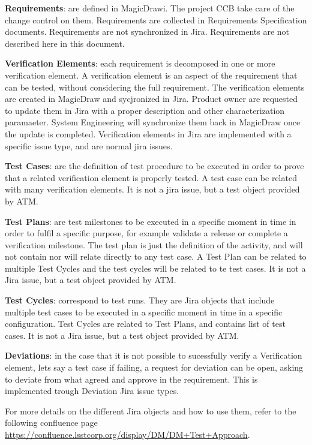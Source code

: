 {\bf Requirements}: are defined in MagicDrawi. The project CCB take care of the change control on them.
Requirements are collected in Requirements Specification documents.
Requirements are not synchronized in Jira.
Requirements are not described here in this document.

{\bf Verification Elements}: each requirement is decomposed in one or more verification element. A verification element is an aspect of the requirement that can be tested, without considering the full requirement. 
The verification elements are created in MagicDraw and sycjronized in Jira. 
Product owner are requested to update them in Jira with a proper description and other characterization paramaeter.
System Engineering will synchronize them back in MagicDraw once the update is completed.
Verification elements in Jira are implemented with a specific issue type, and are normal jira issues.

{\bf Test Cases}: are the definition of test procedure to be executed in order to prove that a related verification element is properly tested. A test case can be related with many verification elements. It is not a jira issue, but a test object provided by ATM.

{\bf Test Plans}: are test milestones to be executed in a specific moment in time in order to fulfil a specific purpose, for example validate a release or complete a verification milestone. 
The test plan is just the definition of the activity, and will not contain nor will relate directly to any test case. 
A Test Plan can be related to multiple Test Cycles and the test cycles will be related to te test cases. 
It is not a Jira issue, but a test object provided by ATM.

{\bf Test Cycles}: correspond to test runs. They are Jira objects that include multiple test cases to be executed in a specific moment in time in a specific configuration. Test Cycles are related to Test Plans, and contains list of test cases. 
It is not a Jira issue, but a test object provided by ATM.

{\bf Deviations}: in the case that it is not possible to sucessfully verify a Verification element, lets say a test case if failing,  a request for deviation can be open, asking to deviate from what agreed and approve in the requirement. 
This is implemented trough Deviation Jira issue types.

For more details on the different Jira objects and how to use them, refer to the following confluence page 
\url{https://confluence.lsstcorp.org/display/DM/DM+Test+Approach}.

